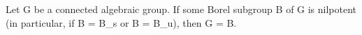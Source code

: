 Let G be a connected algebraic group. If some Borel subgroup B of G is nilpotent (in particular, if B = B_s or B = B_u), then G = B.

